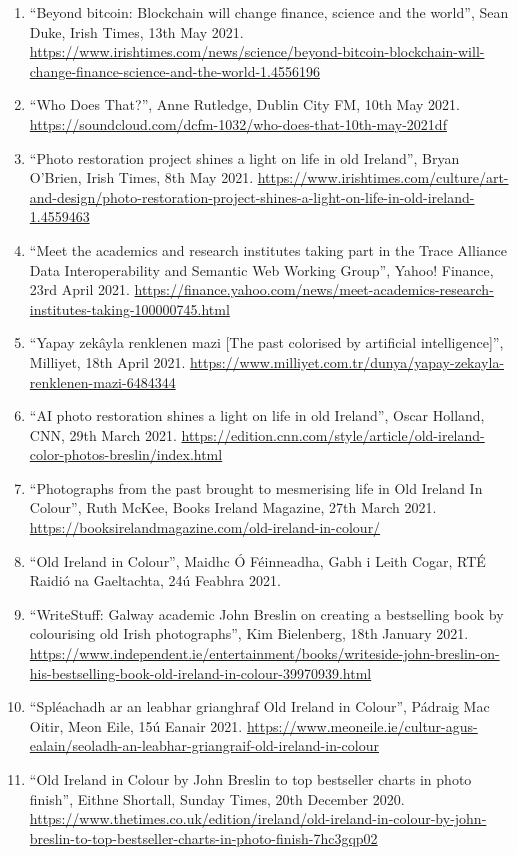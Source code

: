 \documentclass[10pt,a4paper]{res} %
\begin{document}
\begin{resume}
{\begin{enumerate}
\item ``Beyond bitcoin: Blockchain will change finance, science and the world'', Sean Duke, Irish Times, 13th May 2021. \url{https://www.irishtimes.com/news/science/beyond-bitcoin-blockchain-will-change-finance-science-and-the-world-1.4556196}
\item ``Who Does That?'', Anne Rutledge, Dublin City FM, 10th May 2021. \url{https://soundcloud.com/dcfm-1032/who-does-that-10th-may-2021df}
\item ``Photo restoration project shines a light on life in old Ireland'', Bryan O'Brien, Irish Times, 8th May 2021. \url{https://www.irishtimes.com/culture/art-and-design/photo-restoration-project-shines-a-light-on-life-in-old-ireland-1.4559463}
\item ``Meet the academics and research institutes taking part in the Trace Alliance Data Interoperability and Semantic Web Working Group'', Yahoo! Finance, 23rd April 2021. \url{https://finance.yahoo.com/news/meet-academics-research-institutes-taking-100000745.html}
\item ``Yapay zek\^{a}yla renklenen mazi [The past colorised by artificial intelligence]'', Milliyet, 18th April 2021. \url{https://www.milliyet.com.tr/dunya/yapay-zekayla-renklenen-mazi-6484344}
\item ``AI photo restoration shines a light on life in old Ireland'', Oscar Holland, CNN, 29th March 2021. \url{https://edition.cnn.com/style/article/old-ireland-color-photos-breslin/index.html}
\item ``Photographs from the past brought to mesmerising life in Old Ireland In Colour'', Ruth McKee, Books Ireland Magazine, 27th March 2021. \url{https://booksirelandmagazine.com/old-ireland-in-colour/}
\item ``Old Ireland in Colour'', Maidhc \'{O} F\'{e}inneadha, Gabh i Leith Cogar, RT\'{E} Raidi\'{o} na Gaeltachta, 24\'{u} Feabhra 2021.
\item ``WriteStuff: Galway academic John Breslin on creating a bestselling book by colourising old Irish photographs'', Kim Bielenberg, 18th January 2021. \url{https://www.independent.ie/entertainment/books/writeside-john-breslin-on-his-bestselling-book-old-ireland-in-colour-39970939.html}
\item ``Spl\'{e}achadh ar an leabhar grianghraf Old Ireland in Colour'', P\'{a}draig Mac Oitir, Meon Eile, 15\'{u} Eanair 2021. \url{https://www.meoneile.ie/cultur-agus-ealain/seoladh-an-leabhar-griangraif-old-ireland-in-colour}
\item ``Old Ireland in Colour by John Breslin to top bestseller charts in photo finish'', Eithne Shortall, Sunday Times, 20th December 2020. \url{https://www.thetimes.co.uk/edition/ireland/old-ireland-in-colour-by-john-breslin-to-top-bestseller-charts-in-photo-finish-7hc3gqp02}

\end{enumerate}}
\end{resume}
\end{document}
